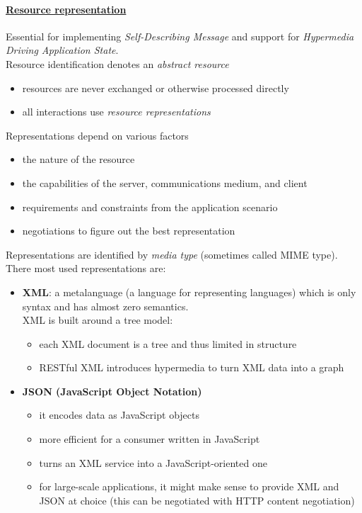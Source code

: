 \documentclass[10pt,a4paper]{article}
\begin{document}
\paragraph{\uline{Resource representation}} Essential for implementing \textit{Self-Describing Message} and support for \textit{Hypermedia Driving Application State}. \\
 Resource identification denotes an \textit{abstract resource}
 \begin{itemize}
 	\item resources are never exchanged or otherwise processed directly
 	\item all interactions use \textit{resource representations}
 \end{itemize}
 Representations depend on various factors
 \begin{itemize}
 	\item the nature of the resource
 	\item the capabilities of the server, communications medium, and client
 	\item requirements and constraints from the application scenario
 	\item negotiations to figure out the best representation
 \end{itemize}
 Representations are identified by \textit{media type} (sometimes called MIME type). There most used representations are:
 \begin{itemize}
 	\item \textbf{XML}: a metalanguage (a language for representing languages) which is only syntax and has almost zero semantics. \\
 	XML is built around a tree model:
 	\begin{itemize}
 		\item each XML document is a tree and thus limited in structure
 		\item RESTful XML introduces hypermedia to turn XML data into a graph
 	\end{itemize}
 	 \pagebreak
 	\item \textbf{JSON (JavaScript Object Notation)}
 	\begin{itemize}
 		\item it encodes data as JavaScript objects
 		\item more efficient for a consumer written in JavaScript
 		\item turns an XML service into a JavaScript-oriented one
 		\item for large-scale applications, it might make sense to provide XML and JSON at choice (this can be negotiated with HTTP content negotiation)
 	\end{itemize}
 \end{itemize}
\end{document}

